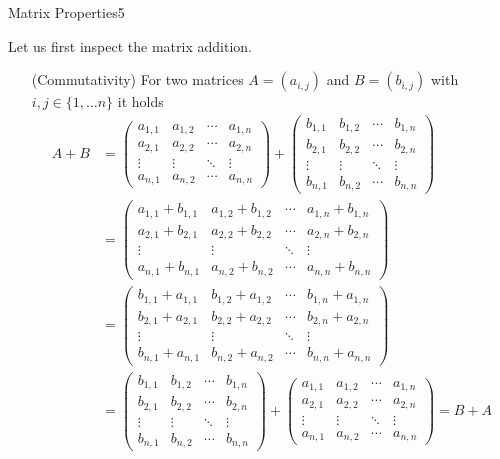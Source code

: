 \begin{questions}
\begin{question}{Matrix Properties}{5}
\begin{answer}
	Let us first inspect the matrix addition.
	\begin{itemize}
		\item[(Commutativity)]
		For two matrices $A = (a_{i, j})$ and $B = (b_{i, j})$ with $i, j \in \{1, \dots n\}$ it holds
		\begin{align*}
A + B &= \begin{pmatrix}
a_{1, 1} & a_{1, 2} & \cdots & a_{1, n}\\
a_{2, 1} & a_{2, 2} & \cdots & a_{2, n}\\
\vdots & \vdots & \ddots & \vdots\\
a_{n, 1} & a_{n, 2} & \cdots & a_{n, n}
\end{pmatrix} + \begin{pmatrix}
b_{1, 1} & b_{1, 2} & \cdots & b_{1, n}\\
b_{2, 1} & b_{2, 2} & \cdots & b_{2, n}\\
\vdots & \vdots & \ddots & \vdots\\
b_{n, 1} & b_{n, 2} & \cdots & b_{n, n}
\end{pmatrix}\\
&= \begin{pmatrix}
a_{1, 1} + b_{1, 1} & a_{1, 2} + b_{1, 2} & \cdots & a_{1, n} + b_{1, n}\\
a_{2, 1} + b_{2, 1} & a_{2, 2} + b_{2, 2} & \cdots & a_{2, n} + b_{2, n}\\
\vdots & \vdots & \ddots & \vdots\\
a_{n, 1} + b_{n, 1} & a_{n, 2} + b_{n, 2} & \cdots & a_{n, n} + b_{n, n}
\end{pmatrix}\\
&= \begin{pmatrix}
b_{1, 1} + a_{1, 1} & b_{1, 2} + a_{1, 2} & \cdots & b_{1, n} + a_{1, n}\\
b_{2, 1} + a_{2, 1} & b_{2, 2} + a_{2, 2} & \cdots & b_{2, n} + a_{2, n}\\
\vdots & \vdots & \ddots & \vdots\\
b_{n, 1} + a_{n, 1} & b_{n, 2} + a_{n, 2} & \cdots & b_{n, n} + a_{n, n}
\end{pmatrix}\\
&= \begin{pmatrix}
b_{1, 1} & b_{1, 2} & \cdots & b_{1, n}\\
b_{2, 1} & b_{2, 2} & \cdots & b_{2, n}\\
\vdots & \vdots & \ddots & \vdots\\
b_{n, 1} & b_{n, 2} & \cdots & b_{n, n}
\end{pmatrix} + \begin{pmatrix}
a_{1, 1} & a_{1, 2} & \cdots & a_{1, n}\\
a_{2, 1} & a_{2, 2} & \cdots & a_{2, n}\\
\vdots & \vdots & \ddots & \vdots\\
a_{n, 1} & a_{n, 2} & \cdots & a_{n, n}
\end{pmatrix} = B + A
		\end{align*}
	

\end{itemize}
\end{answer}
\end{question}
\end{questions}
